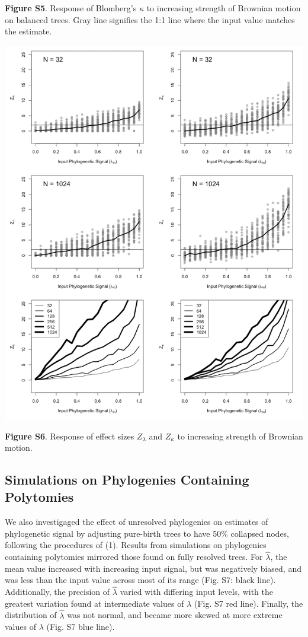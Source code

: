 \documentclass[
]{article}
\begin{document}
\textbf{Figure S5}. Response of Blomberg's \(\kappa\) to increasing
strength of Brownian motion on balanced trees. Gray line signifies the
1:1 line where the input value matches the estimate.

\includegraphics[width=0.95\linewidth]{fig.S6}

\textbf{Figure S6}. Response of effect sizes \(Z_{\lambda}\) and
\(Z_{\kappa}\) to increasing strength of Brownian motion.

\newpage

\hypertarget{simulations-on-phylogenies-containing-polytomies}{%
\subsection{Simulations on Phylogenies Containing
Polytomies}\label{simulations-on-phylogenies-containing-polytomies}}

We also investigaged the effect of unresolved phylogenies on estimates
of phylogenetic signal by adjusting pure-birth trees to have 50\%
collapsed nodes, following the procedures of (1). Results from
simulations on phylogenies containing polytomies mirrored those found on
fully resolved trees. For \(\hat{\lambda}\), the mean value increased
with increasing input signal, but was negatively biased, and was less
than the input value across most of its range (Fig. S7: black line).
Additionally, the precision of \(\hat{\lambda}\) varied with differing
input levels, with the greatest variation found at intermediate values
of \(\lambda\) (Fig. S7 red line). Finally, the distribution of
\(\hat{\lambda}\) was not normal, and became more skewed at more extreme
values of \(\lambda\) (Fig. S7 blue line). \hfill\break
\end{document}
